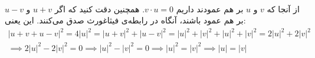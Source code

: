 \\
از آنجا که
$v$ و $u$
بر هم عمودند داریم
$v \cdot u = 0$.
همچنین دقت کنید که اگر
$u + v$ و $u - v$
بر هم عمود باشند، آنگاه در رابطه‌ی فیثاغورث صدق می‌کنند. این یعنی:
\begin{gather*}
    |u + v + u - v|^2 = 4|u|^2 = |u + v|^2 + |u - v|^2 = |u|^2 + |v|^2 + |u|^2 + |v|^2 = 2|u|^2 + 2|v|^2\\
    \implies 2|u|^2 - 2|v|^2 = 0 \implies |u|^2 - |v|^2 = 0 \implies |u|^2 = |v|^2 \implies |u| = |v|
\end{gather*}